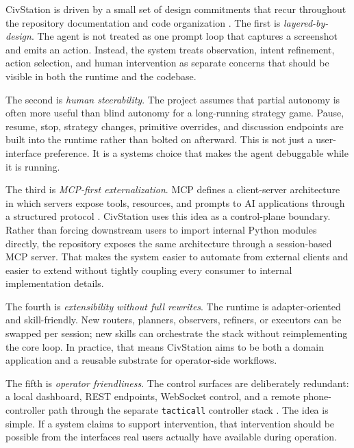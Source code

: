 CivStation is driven by a small set of design commitments that recur throughout the repository documentation and code organization \cite{civstation_repo}. The first is \emph{layered-by-design}. The agent is not treated as one prompt loop that captures a screenshot and emits an action. Instead, the system treats observation, intent refinement, action selection, and human intervention as separate concerns that should be visible in both the runtime and the codebase.

The second is \emph{human steerability}. The project assumes that partial autonomy is often more useful than blind autonomy for a long-running strategy game. Pause, resume, stop, strategy changes, primitive overrides, and discussion endpoints are built into the runtime rather than bolted on afterward. This is not just a user-interface preference. It is a systems choice that makes the agent debuggable while it is running.

The third is \emph{MCP-first externalization}. MCP defines a client-server architecture in which servers expose tools, resources, and prompts to AI applications through a structured protocol \cite{mcp_architecture}. CivStation uses this idea as a control-plane boundary. Rather than forcing downstream users to import internal Python modules directly, the repository exposes the same architecture through a session-based MCP server. That makes the system easier to automate from external clients and easier to extend without tightly coupling every consumer to internal implementation details.

The fourth is \emph{extensibility without full rewrites}. The runtime is adapter-oriented and skill-friendly. New routers, planners, observers, refiners, or executors can be swapped per session; new skills can orchestrate the stack without reimplementing the core loop. In practice, that means CivStation aims to be both a domain application and a reusable substrate for operator-side workflows.

The fifth is \emph{operator friendliness}. The control surfaces are deliberately redundant: a local dashboard, REST endpoints, WebSocket control, and a remote phone-controller path through the separate \texttt{tacticall} controller stack \cite{tacticall_repo}. The idea is simple. If a system claims to support intervention, that intervention should be possible from the interfaces real users actually have available during operation.

